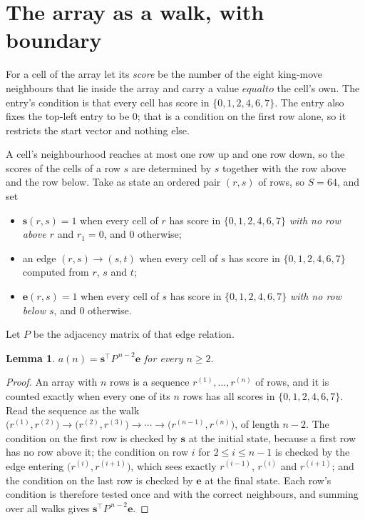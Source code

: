 \documentclass[11pt,a4paper]{article}
\theoremstyle{plain}
\newtheorem{lemma}[theorem]{Lemma}
\theoremstyle{definition}
\begin{document}
\section{The array as a walk, with boundary}

For a cell of the array let its \emph{score} be the number of the eight king-move neighbours that lie inside
the array and carry a value $equal to$ the cell's own. The entry's condition is that every cell
has score in $\{0,1,2,4,6,7\}$. The entry also fixes the top-left entry to be $0$; that is a condition on the first row alone, so it restricts the start vector and nothing else.

A cell's neighbourhood reaches at most one row up and one row down, so the scores of the
cells of a row $s$ are determined by $s$ together with the row above and the row below.
Take as state an ordered pair $(r,s)$ of rows, so $S=64$, and set
\begin{itemize}
\item $\mathbf{s}(r,s)=1$ when every cell of $r$ has score in $\{0,1,2,4,6,7\}$ \emph{with no row
above $r$} and $r_1=0$, and $0$ otherwise;
\item an edge $(r,s)\to(s,t)$ when every cell of $s$ has score in $\{0,1,2,4,6,7\}$ computed from
$r$, $s$ and $t$;
\item $\mathbf{e}(r,s)=1$ when every cell of $s$ has score in $\{0,1,2,4,6,7\}$ \emph{with no row
below $s$}, and $0$ otherwise.
\end{itemize}
Let $P$ be the adjacency matrix of that edge relation.

\begin{lemma}\label{lem:walk}
$a(n)=\mathbf{s}^{\!\top}P^{\,n-2}\mathbf{e}$ for every $n\ge2$.
\end{lemma}

\begin{proof}
An array with $n$ rows is a sequence $r^{(1)},\dots,r^{(n)}$ of rows, and it is counted
exactly when every one of its $n$ rows has all scores in $\{0,1,2,4,6,7\}$. Read the sequence as the
walk $\bigl(r^{(1)},r^{(2)}\bigr)\to\bigl(r^{(2)},r^{(3)}\bigr)\to\cdots\to
\bigl(r^{(n-1)},r^{(n)}\bigr)$, of length $n-2$. The condition on the first row is
checked by $\mathbf{s}$ at the initial state, because a first row has no row above it; the
condition on row $i$ for $2\le i\le n-1$ is checked by the edge entering
$\bigl(r^{(i)},r^{(i+1)}\bigr)$, which sees exactly $r^{(i-1)}$, $r^{(i)}$ and
$r^{(i+1)}$; and the condition on the last row is checked by $\mathbf{e}$ at the final
state. Each row's condition is therefore tested once and with the correct neighbours, and
summing over all walks gives $\mathbf{s}^{\!\top}P^{\,n-2}\mathbf{e}$.
\end{proof}
\end{document}
